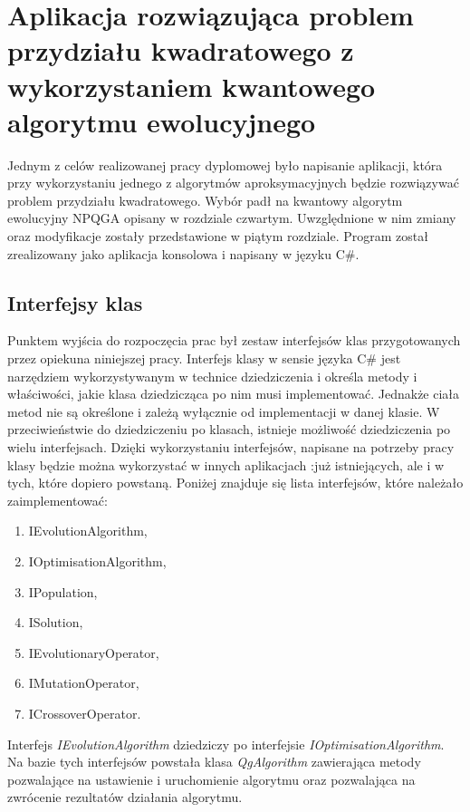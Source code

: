 \chapter{Aplikacja rozwiązująca problem przydziału kwadratowego z wykorzystaniem kwantowego algorytmu ewolucyjnego}
\label{cha:aplikacja}
Jednym z celów realizowanej pracy dyplomowej było napisanie aplikacji, która przy wykorzystaniu jednego z algorytmów aproksymacyjnych będzie rozwiązywać problem przydziału kwadratowego. Wybór padł na kwantowy algorytm ewolucyjny NPQGA opisany w rozdziale czwartym. Uwzględnione w nim zmiany oraz modyfikacje zostały przedstawione w piątym rozdziale. Program został zrealizowany jako aplikacja konsolowa i napisany w języku C\#.

\section{Interfejsy klas}
Punktem wyjścia do rozpoczęcia prac był zestaw interfejsów klas przygotowanych przez opiekuna niniejszej pracy. Interfejs klasy w sensie języka C\# jest narzędziem wykorzystywanym w technice dziedziczenia i określa metody i właściwości, jakie klasa dziedzicząca po nim musi implementować. Jednakże ciała metod nie są określone i zależą wyłącznie od implementacji w danej klasie. W przeciwieństwie do dziedziczeniu po klasach, istnieje możliwość dziedziczenia po wielu interfejsach. Dzięki wykorzystaniu interfejsów, napisane na potrzeby pracy klasy będzie można wykorzystać w innych aplikacjach :już istniejących, ale i w tych, które dopiero powstaną. Poniżej znajduje się lista interfejsów, które należało zaimplementować:
\begin{enumerate}
\item IEvolutionAlgorithm,
\item IOptimisationAlgorithm,
\item IPopulation,
\item ISolution,
\item IEvolutionaryOperator,
\item IMutationOperator,
\item ICrossoverOperator.
\end{enumerate}

Interfejs \textit{IEvolutionAlgorithm} dziedziczy po interfejsie \textit{IOptimisationAlgorithm}. Na bazie tych interfejsów powstała klasa \textit{QgAlgorithm} zawierająca metody pozwalające na ustawienie i uruchomienie algorytmu oraz pozwalająca na zwrócenie rezultatów działania algorytmu.

